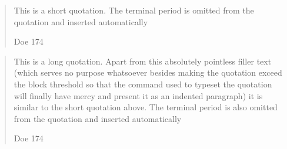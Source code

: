 \documentclass[a4paper]{article}
\newcommand*{\example}[1]{%
  \addvspace{\baselineskip}%
  \par\noindent\hspace{-4em}%
  \makebox[3em][r]{\textbf{Ex. #1}}%
  \hspace{1em}\ignorespaces}
\begin{document}



\renewcommand*{\mkcitation}[1]{ (#1)} %


\newcommand*{\mkmidblockpunct}[1]{%
  \ifblockquote{.}{}}

\newcommand*{\mkfinblockpunct}[1]{%
  \ifblockquote{}{.}}

%

\example{1}
\blockquote[Doe 174]{This is a short quotation. The terminal period is omitted
from the quotation and inserted automatically}

\blockquote[Doe 174]{This is a long quotation. Apart from this absolutely
pointless filler text (which serves no purpose whatsoever besides making the
quotation exceed the block threshold so that the command used to typeset the
quotation will finally have mercy and present it as an indented paragraph) it
is similar to the short quotation above. The terminal period is also omitted
from the quotation and inserted automatically}

\end{document}
